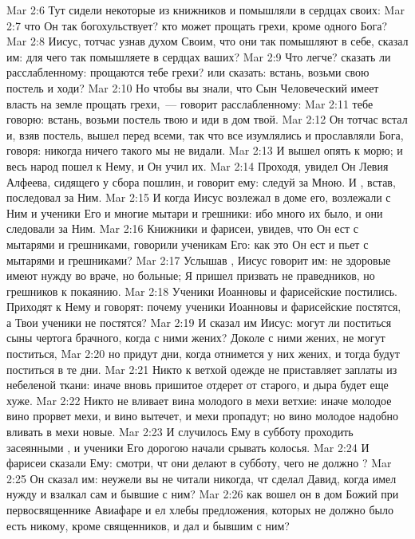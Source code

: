 \vs Mar 2:6 Тут сидели некоторые из книжников и помышляли в сердцах своих:
\vs Mar 2:7 что Он так богохульствует? кто может прощать грехи, кроме одного Бога?
\vs Mar 2:8 Иисус, тотчас узнав духом Своим, что они так помышляют в себе, сказал им: для чего так помышляете в сердцах ваших?
\vs Mar 2:9 Что легче? сказать ли расслабленному: прощаются тебе грехи? или сказать: встань, возьми свою постель и ходи?
\vs Mar 2:10 Но чтобы вы знали, что Сын Человеческий имеет власть на земле прощать грехи,~--- говорит расслабленному:
\vs Mar 2:11 тебе говорю: встань, возьми постель твою и иди в дом твой.
\vs Mar 2:12 Он тотчас встал и, взяв постель, вышел перед всеми, так что все изумлялись и прославляли Бога, говоря: никогда ничего такого мы не видали.
\rsbpar\vs Mar 2:13 И вышел  опять к морю; и весь народ пошел к Нему, и Он учил их.
\vs Mar 2:14 Проходя, увидел Он Левия Алфеева, сидящего у сбора пошлин, и говорит ему: следуй за Мною. И , встав, последовал за Ним.
\vs Mar 2:15 И когда Иисус возлежал в доме его, возлежали с Ним и ученики Его и многие мытари и грешники: ибо много их было, и они следовали за Ним.
\vs Mar 2:16 Книжники и фарисеи, увидев, что Он ест с мытарями и грешниками, говорили ученикам Его: как это Он ест и пьет с мытарями и грешниками?
\vs Mar 2:17 Услышав , Иисус говорит им: не здоровые имеют нужду во враче, но больные; Я пришел призвать не праведников, но грешников к покаянию.
\rsbpar\vs Mar 2:18 Ученики Иоанновы и фарисейские постились. Приходят к Нему и говорят: почему ученики Иоанновы и фарисейские постятся, а Твои ученики не постятся?
\vs Mar 2:19 И сказал им Иисус: могут ли поститься сыны чертога брачного, когда с ними жених? Доколе с ними жених, не могут поститься,
\vs Mar 2:20 но придут дни, когда отнимется у них жених, и тогда будут поститься в те дни.
\vs Mar 2:21 Никто к ветхой одежде не приставляет заплаты из небеленой ткани: иначе вновь пришитое отдерет от старого, и дыра будет еще хуже.
\vs Mar 2:22 Никто не вливает вина молодого в мехи ветхие: иначе молодое вино прорвет мехи, и вино вытечет, и мехи пропадут; но вино молодое надобно вливать в мехи новые.
\rsbpar\vs Mar 2:23 И случилось Ему в субботу проходить засеянными , и ученики Его дорогою начали срывать колосья.
\vs Mar 2:24 И фарисеи сказали Ему: смотри, чт они делают в субботу, чего не должно ?
\vs Mar 2:25 Он сказал им: неужели вы не читали никогда, чт сделал Давид, когда имел нужду и взалкал сам и бывшие с ним?
\vs Mar 2:26 как вошел он в дом Божий при первосвященнике Авиафаре и ел хлебы предложения, которых не должно было есть никому, кроме священников, и дал и бывшим с ним?
